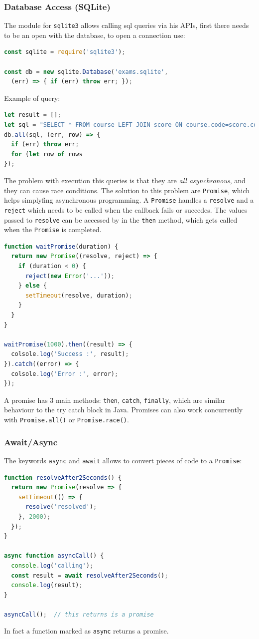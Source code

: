 \documentclass[12pt]{article}
\begin{document}
\subsubsection{Database Access (SQLite)}
The module for \texttt{sqlite3} allows calling sql queries via his APIs, first there needs to be an open with the database, to open a connection use:
\begin{lstlisting}[language=js]
const sqlite = require('sqlite3');

const db = new sqlite.Database('exams.sqlite', 
  (err) => { if (err) throw err; });
\end{lstlisting}
Example of query:
\begin{lstlisting}[language=js]
let result = [];
let sql = "SELECT * FROM course LEFT JOIN score ON course.code=score.coursecode";
db.all(sql, (err, row) => {
  if (err) throw err;
  for (let row of rows
});
\end{lstlisting}
The problem with execution this queries is that they are \emph{all asynchronous}, and they can cause race conditions. The solution to this problem are \texttt{Promise}, which helps simplyfing asynchronous programming. A \texttt{Promise} handles a \texttt{resolve} and a \texttt{reject} which needs to be called when the callback fails or succedes. The values passed to \texttt{resolve} can be accessed by in the \texttt{then} method, which gets called when the \texttt{Promise} is completed.
\begin{lstlisting}[language=js]
function waitPromise(duration) {
  return new Promise((resolve, reject) => {
    if (duration < 0) {
      reject(new Error('...'));
    } else {
      setTimeout(resolve, duration);
    }
  }
}

waitPromise(1000).then((result) => {
  colsole.log('Success :', result);
}).catch((error) => {
  colsole.log('Error :', error);
});
\end{lstlisting}
A promise has 3 main methods: \texttt{then}, \texttt{catch}, \texttt{finally}, which are similar behaviour to the try catch block in Java. Promises can also work concurrently with \texttt{Promise.all()} or \texttt{Promise.race()}.

\subsubsection{Await/Async}
The keywords \texttt{async} and \texttt{await} allows to convert pieces of code to a \texttt{Promise}:
\begin{lstlisting}[language=js]
function resolveAfter2Seconds() {
  return new Promise(resolve => {
    setTimeout(() => {
      resolve('resolved');
    }, 2000);
  });
}

async function asyncCall() {
  console.log('calling');
  const result = await resolveAfter2Seconds();
  console.log(result);
}

asyncCall();  // this returns is a promise
\end{lstlisting}
In fact a function marked as \texttt{async} returns a promise.
\end{document}
